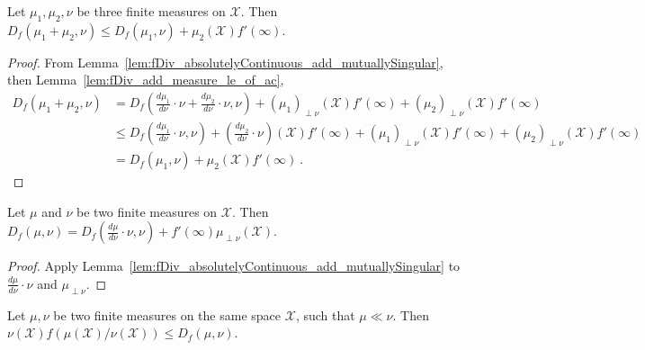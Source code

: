 \begin{lemma}
  \label{lem:fDiv_add_measure_le}
  \leanok
  Let $\mu_1, \mu_2, \nu$ be three finite measures on $\mathcal X$. Then
  $D_f(\mu_1 + \mu_2, \nu) \le D_f(\mu_1, \nu) + \mu_2(\mathcal X) f'(\infty)$.
\end{lemma}

\begin{proof}\leanok
{}
From Lemma~\ref{lem:fDiv_absolutelyContinuous_add_mutuallySingular}, then Lemma~\ref{lem:fDiv_add_measure_le_of_ac},
\begin{align*}
D_f(\mu_1 + \mu_2, \nu)
&= D_f(\frac{d\mu_1}{d \nu}\cdot \nu + \frac{d\mu_2}{d \nu}\cdot \nu, \nu) + (\mu_1)_{\perp\nu}(\mathcal X) f'(\infty) + (\mu_2)_{\perp\nu}(\mathcal X) f'(\infty)
\\
&\le D_f(\frac{d\mu_1}{d \nu}\cdot \nu, \nu) + (\frac{d\mu_2}{d \nu}\cdot \nu)(\mathcal X) f'(\infty) + (\mu_1)_{\perp\nu}(\mathcal X) f'(\infty) + (\mu_2)_{\perp\nu}(\mathcal X) f'(\infty)
\\
&= D_f(\mu_1, \nu) + \mu_2(\mathcal X) f'(\infty)
\: .
\end{align*}
\end{proof}


\begin{lemma}
  \label{lem:fDiv_eq_add_withDensity_derivAtTop}
  \leanok
  Let $\mu$ and $\nu$ be two finite measures on $\mathcal X$.
  Then $D_f(\mu, \nu) = D_f(\frac{d\mu}{d\nu}\cdot \nu, \nu) + f'(\infty) \mu_{\perp \nu}(\mathcal X)$.
\end{lemma}

\begin{proof}\leanok
{}
Apply Lemma~\ref{lem:fDiv_absolutelyContinuous_add_mutuallySingular} to $\frac{d\mu}{d\nu}\cdot \nu$ and $\mu_{\perp \nu}$.
\end{proof}


\begin{lemma}
  \label{lem:le_fDiv_of_ac}
  \leanok
  Let $\mu, \nu$ be two finite measures on the same space $\mathcal X$, such that $\mu \ll \nu$. Then $\nu(\mathcal X) f(\mu(\mathcal X)/\nu(\mathcal X)) \le D_f(\mu, \nu)$.
\end{lemma}


